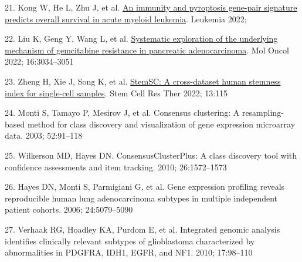 \documentclass[
  12pt,
]{book}
\newlength{\cslhangindent}
\newlength{\cslentryspacingunit} %
\newenvironment{CSLReferences}[2] %
 {%
  \setlength{\parindent}{0pt}
  \ifodd #1
  \let\oldpar\par
  \def\par{\hangindent=\cslhangindent\oldpar}
  \fi
  \setlength{\parskip}{#2\cslentryspacingunit}
 }%
 {}
\begin{document}
\begin{CSLReferences}{0}{0}
\leavevmode{}%
21. Kong W, He L, Zhu J, et al. \href{https://doi.org/10.1038/s41375-022-01662-6}{An immunity and pyroptosis gene-pair signature predicts overall survival in acute myeloid leukemia}. Leukemia 2022;

\leavevmode{}%
22. Liu K, Geng Y, Wang L, et al. \href{https://doi.org/10.1002/1878-0261.13279}{Systematic exploration of the underlying mechanism of gemcitabine resistance in pancreatic adenocarcinoma}. Mol Oncol 2022; 16:3034--3051

\leavevmode{}%
23. Zheng H, Xie J, Song K, et al. \href{https://doi.org/10.1186/s13287-022-02803-5}{StemSC: A cross-dataset human stemness index for single-cell samples}. Stem Cell Res Ther 2022; 13:115

\leavevmode{}%
24. Monti S, Tamayo P, Mesirov J, et al. Consensus clustering: A resampling-based method for class discovery and visualization of gene expression microarray data. 2003; 52:91--118

\leavevmode{}%
25. Wilkerson MD, Hayes DN. ConsensusClusterPlus: A class discovery tool with confidence assessments and item tracking. 2010; 26:1572--1573

\leavevmode{}%
26. Hayes DN, Monti S, Parmigiani G, et al. Gene expression profiling reveals reproducible human lung adenocarcinoma subtypes in multiple independent patient cohorts. 2006; 24:5079--5090

\leavevmode{}%
27. Verhaak RG, Hoadley KA, Purdom E, et al. Integrated genomic analysis identifies clinically relevant subtypes of glioblastoma characterized by abnormalities in PDGFRA, IDH1, EGFR, and NF1. 2010; 17:98--110

\end{CSLReferences}
\end{document}
